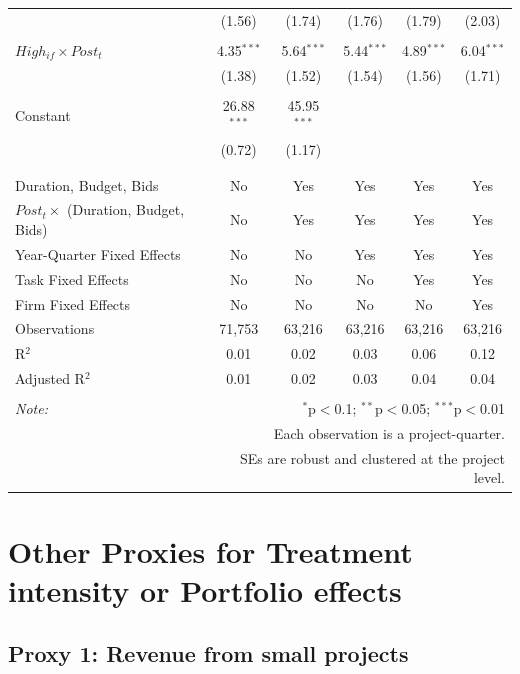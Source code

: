 \documentclass[
]{article}
\begin{document}
\begin{table}[H]
\begin{tabular}{@{\extracolsep{-2pt}}lccccc}
  & (1.56) & (1.74) & (1.76) & (1.79) & (2.03) \\ 
  & & & & & \\ 
 $High_{if} \times Post_t$ & 4.35$^{***}$ & 5.64$^{***}$ & 5.44$^{***}$ & 4.89$^{***}$ & 6.04$^{***}$ \\ 
  & (1.38) & (1.52) & (1.54) & (1.56) & (1.71) \\ 
  & & & & & \\ 
 Constant & 26.88$^{***}$ & 45.95$^{***}$ &  &  &  \\ 
  & (0.72) & (1.17) &  &  &  \\ 
  & & & & & \\ 
\hline \\[-1.8ex] 
Duration, Budget, Bids & No & Yes & Yes & Yes & Yes \\ 
$Post_t \times$  (Duration, Budget, Bids) & No & Yes & Yes & Yes & Yes \\ 
Year-Quarter Fixed Effects & No & No & Yes & Yes & Yes \\ 
Task Fixed Effects & No & No & No & Yes & Yes \\ 
Firm Fixed Effects & No & No & No & No & Yes \\ 
Observations & 71,753 & 63,216 & 63,216 & 63,216 & 63,216 \\ 
R$^{2}$ & 0.01 & 0.02 & 0.03 & 0.06 & 0.12 \\ 
Adjusted R$^{2}$ & 0.01 & 0.02 & 0.03 & 0.04 & 0.04 \\ 
\hline 
\hline \\[-1.8ex] 
\textit{Note:}  & \multicolumn{5}{r}{$^{*}$p$<$0.1; $^{**}$p$<$0.05; $^{***}$p$<$0.01} \\ 
 & \multicolumn{5}{r}{Each observation is a project-quarter.} \\ 
 & \multicolumn{5}{r}{SEs are robust and clustered at the project level.} \\ 
\end{tabular} 
\end{table}

\hypertarget{other-proxies-for-treatment-intensity-or-portfolio-effects}{%
\section{Other Proxies for Treatment intensity or Portfolio
effects}\label{other-proxies-for-treatment-intensity-or-portfolio-effects}}

\hypertarget{proxy-1-revenue-from-small-projects}{%
\subsection{Proxy 1: Revenue from small
projects}\label{proxy-1-revenue-from-small-projects}}
\end{document}
